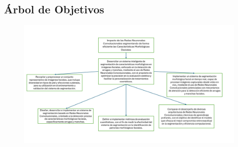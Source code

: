 	
	\label{anexo2}
	\begin{landscape}
		\section{Árbol de Objetivos}
	\begin{figure}[H]
		\centering
			\includegraphics[width=\linewidth]{anexos/arb_objetivos.jpg}
	\end{figure}
	\end{landscape}
	\clearpage
	

